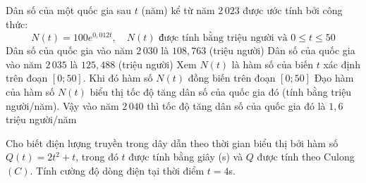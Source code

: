 \begin{ex}%
	Dân số của một quốc gia sau  \( t \) (năm) kể từ năm $2\,023$ được ước tính bởi công thức:
	\[N(t) = 100e^{0{,}012t}, \quad N(t) \text{ được tính bằng triệu người và } 0 \leq t \leq 50 \] 
	\choiceTF 
		{\True Dân số của quốc gia vào năm $2\,030$  là $108{,}763$ (triệu người)}
		{Dân số của quốc gia vào  năm $2\,035$ là $125{,}488$ (triệu người)}
		{\True Xem $N(t)$ là hàm số của biến  $t$ xác định trên đoạn $[0; 50]$. Khi đó hàm số $N(t)$ đồng biến trên đoạn $[0; 50]$}
		{Đạo hàm  của hàm số $N(t)$ biểu thị tốc độ tăng dân số của quốc gia đó (tính bằng triệu người/năm). Vậy vào năm $2\,040$ thì tốc độ tăng dân số của quốc gia đó là $1{,}6$ triệu người/năm}
\end{ex}



\begin{bt}%
	Cho biết điện lượng truyền trong dây dẫn theo thời gian biểu thị bởi hàm số $Q(t)=2t^2+t$, trong đó $t$ được tính bằng giây (s) và $Q$ được tính theo Culong $(C)$. Tính cường  độ dòng điện tại thời điểm $t=4$s.
\end{bt}

